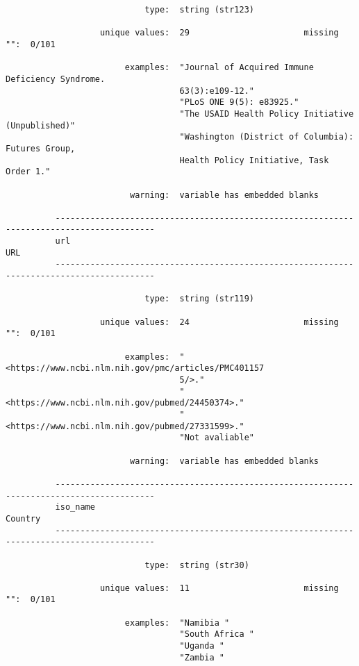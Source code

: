 \documentclass{article}
\begin{document}
\begin{verbatim}
                            type:  string (str123)
          
                   unique values:  29                       missing "":  0/101
          
                        examples:  "Journal of Acquired Immune Deficiency Syndrome.
                                   63(3):e109-12."
                                   "PLoS ONE 9(5): e83925."
                                   "The USAID Health Policy Initiative (Unpublished)"
                                   "Washington (District of Columbia): Futures Group,
                                   Health Policy Initiative, Task Order 1."
          
                         warning:  variable has embedded blanks
          
          ------------------------------------------------------------------------------------------
          url                                                                                    URL
          ------------------------------------------------------------------------------------------
          
                            type:  string (str119)
          
                   unique values:  24                       missing "":  0/101
          
                        examples:  "<https://www.ncbi.nlm.nih.gov/pmc/articles/PMC401157
                                   5/>."
                                   "<https://www.ncbi.nlm.nih.gov/pubmed/24450374>."
                                   "<https://www.ncbi.nlm.nih.gov/pubmed/27331599>."
                                   "Not avaliable"
          
                         warning:  variable has embedded blanks
          
          ------------------------------------------------------------------------------------------
          iso_name                                                                           Country
          ------------------------------------------------------------------------------------------
          
                            type:  string (str30)
          
                   unique values:  11                       missing "":  0/101
          
                        examples:  "Namibia "
                                   "South Africa "
                                   "Uganda "
                                   "Zambia "
          

\end{verbatim}
\end{document}
